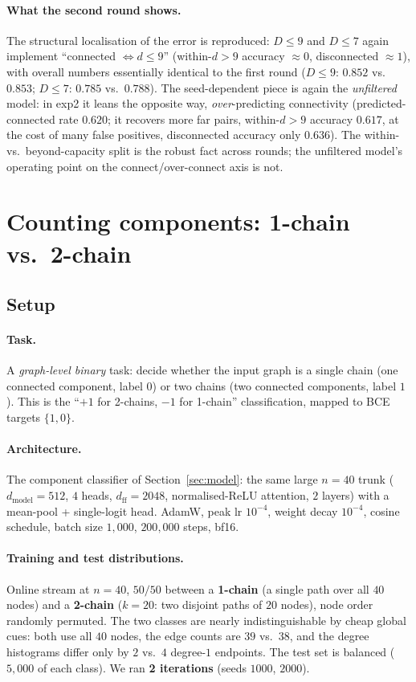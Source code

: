 \documentclass[11pt,a4paper]{article}
\begin{document}
\paragraph{What the second round shows.} The structural localisation of the error
is reproduced: $D \le 9$ and $D \le 7$ again implement ``connected $\iff d \le
9$'' (within-$d{>}9$ accuracy $\approx 0$, disconnected $\approx 1$), with overall
numbers essentially identical to the first round ($D \le 9$: $0.852$ vs.\ $0.853$;
$D \le 7$: $0.785$ vs.\ $0.788$). The
seed-dependent piece is again the \emph{unfiltered} model: in exp2 it leans the
opposite way, \emph{over}-predicting connectivity (predicted-connected rate
$0.620$; it recovers more far pairs, within-$d{>}9$ accuracy $0.617$, at the cost
of many false positives, disconnected accuracy only $0.636$). The within- vs.\
beyond-capacity split is the robust fact across rounds; the unfiltered model's
operating point on the connect/over-connect axis is not.

\section{Counting components: 1-chain vs.\ 2-chain}
\label{sec:count}

\subsection{Setup}

\paragraph{Task.} A \emph{graph-level binary} task: decide whether the input
graph is a single chain (one connected component, label $0$) or two chains (two
connected components, label $1$). This is the ``$+1$ for 2-chains, $-1$ for
1-chain'' classification, mapped to BCE targets $\{1, 0\}$.

\paragraph{Architecture.} The component classifier of Section~\ref{sec:model}:
the same large $n = 40$ trunk ($d_{\mathrm{model}} = 512$, $4$ heads,
$d_{\mathrm{ff}} = 2048$, normalised-ReLU attention, $2$ layers) with a
mean-pool + single-logit head. AdamW, peak lr $10^{-4}$, weight decay
$10^{-4}$, cosine schedule, batch size $1{,}000$, $200{,}000$ steps, bf16.

\paragraph{Training and test distributions.} Online stream at $n = 40$, $50/50$
between a \textbf{1-chain} (a single path over all $40$ nodes) and a
\textbf{2-chain} ($k = 20$: two disjoint paths of $20$ nodes), node order
randomly permuted. The two classes are nearly indistinguishable by cheap global
cues: both use all $40$ nodes, the edge counts are $39$ vs.\ $38$, and the
degree histograms differ only by $2$ vs.\ $4$ degree-$1$ endpoints. The test set
is balanced ($5{,}000$ of each class). We ran \textbf{2 iterations}
(seeds $1000$, $2000$).
\end{document}
